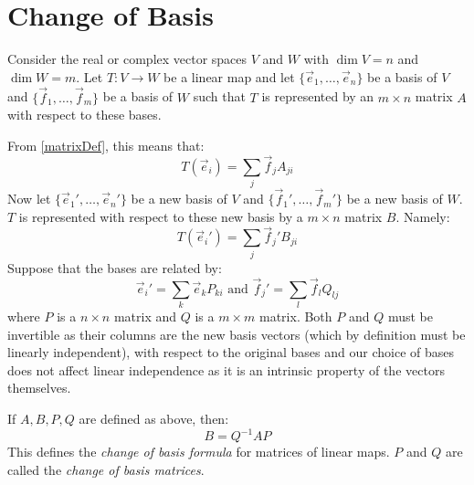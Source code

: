 \documentclass[../main.tex]{subfiles}
\begin{document}
\section{Change of Basis}
\label{changeOfBasis}
Consider the real or complex vector spaces $V$ and $W$ with $\dim V = n$ and $\dim W = m$.
Let $T: V \to W$ be a linear map and let $\{\vec{e}_1, \ldots, \vec{e}_n\}$ be a basis of $V$ and $\{\vec{f}_1, \ldots, \vec{f}_m\}$ be a basis of $W$ such that $T$ is represented by an $m \times n$ matrix $A$ with respect to these bases.

From \cref{matrixDef}, this means that:
\[
  T(\vec{e}_i) = \sum_{j} \vec{f}_j A_{j i}
\]
Now let $\{\vec{e}_1', \ldots, \vec{e}_n'\}$ be a new basis of $V$ and $\{\vec{f}_1', \ldots, \vec{f}_m'\}$ be a new basis of $W$.
$T$ is represented with respect to these new basis by a $m \times n$ matrix $B$.
Namely:
\[
  T(\vec{e}_i') = \sum_{j} \vec{f}_j' B_{j i}
\]
Suppose that the bases are related by:
\[
  \vec{e}_i' = \sum_{k} \vec{e}_k P_{k i} \text{ and } \vec{f}_j' = \sum_{l} \vec{f}_l Q_{l j}
\]
where $P$ is a $n \times n$ matrix and $Q$ is a $m \times m$ matrix.
Both $P$ and $Q$ must be invertible as their columns are the new basis vectors (which by definition must be linearly independent), with respect to the original bases and our choice of bases does not affect linear independence as it is an intrinsic property of the vectors themselves.
\begin{proposition}
  If $A, B, P, Q$ are defined as above, then:
  \[
    B = Q^{-1} A P
  \]
  This defines the \textit{change of basis formula} for matrices of linear maps.
  $P$ and $Q$ are called the \textit{change of basis matrices}.
\end{proposition}
\end{document}
